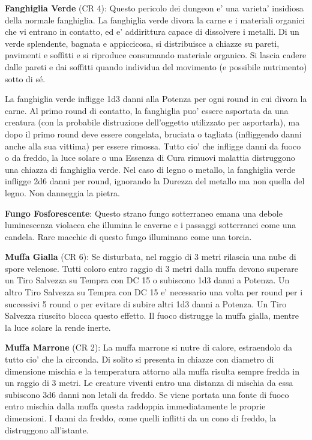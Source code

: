 \documentclass[a4paper,11pt,twoside,openany]{dndbook}
\begin{document}
\textbf{Fanghiglia Verde} (CR 4): Questo pericolo dei dungeon e' una varieta' insidiosa della normale fanghiglia. La fanghiglia verde divora la carne e i materiali organici che vi entrano in contatto, ed e' addirittura capace di dissolvere i metalli. Di un verde splendente, bagnata e appiccicosa, si distribuisce a chiazze su pareti, pavimenti e soffitti e si riproduce consumando materiale organico. Si lascia cadere dalle pareti e dai soffitti quando individua del movimento (e possibile nutrimento) sotto di sé.

La fanghiglia verde infligge 1d3 danni alla Potenza per ogni round in cui divora la carne. Al primo round di contatto, la fanghiglia puo' essere asportata da una creatura (con la probabile distruzione dell'oggetto utilizzato per asportarla), ma dopo il primo round deve essere congelata, bruciata o tagliata (infliggendo danni anche alla sua vittima) per essere rimossa. Tutto cio' che infligge danni da fuoco o da freddo, la luce solare o una Essenza di Cura rimuovi malattia distruggono una chiazza di fanghiglia verde. Nel caso di legno o metallo, la fanghiglia verde infligge 2d6 danni per round, ignorando la Durezza del metallo ma non quella del legno. Non danneggia la pietra.

\textbf{Fungo Fosforescente}: Questo strano fungo sotterraneo emana una debole luminescenza violacea che illumina le caverne e i passaggi sotterranei come una candela. Rare macchie di questo fungo illuminano come una torcia.

\textbf{Muffa Gialla} (CR 6): Se disturbata, nel raggio di 3 metri rilascia una nube di spore velenose. Tutti coloro entro raggio di 3 metri dalla muffa devono superare un Tiro Salvezza su Tempra con DC 15 o subiscono 1d3 danni a Potenza. Un altro Tiro Salvezza su Tempra con DC 15 e' necessario una volta per round per i successivi 5 round o per evitare di subire altri 1d3 danni a Potenza. Un Tiro Salvezza riuscito blocca questo effetto. Il fuoco distrugge la muffa gialla, mentre la luce solare la rende inerte.

\textbf{Muffa Marrone} (CR 2): La muffa marrone si nutre di calore, estraendolo da tutto cio' che la circonda. Di solito si presenta in chiazze con diametro di dimensione mischia e la temperatura attorno alla muffa risulta sempre fredda in un raggio di 3 metri. Le creature viventi entro una distanza di mischia da essa subiscono 3d6 danni non letali da freddo. Se viene portata una fonte di fuoco entro mischia dalla muffa questa raddoppia immediatamente le proprie dimensioni. I danni da freddo, come quelli inflitti da un cono di freddo, la distruggono all'istante.
\end{document}
